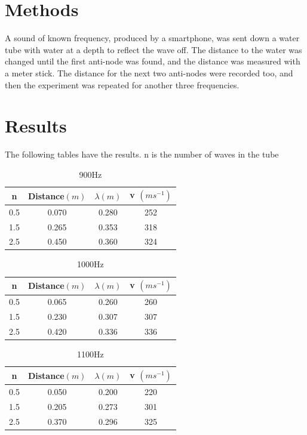 \documentclass{article}
\begin{document}
\section{Methods}
A sound of known frequency, produced by a smartphone, was sent down a water tube with water at a depth to reflect the wave off. The distance to the water was changed until the first anti-node was found, and the distance was measured with a meter stick. The distance for the next two anti-nodes were recorded too, and then the experiment was repeated for another three frequencies.


\section{Results}

The following tables have the results. n is the number of waves in the tube

\begin{table}[H]
    \centering
    \begin{tabular}{|c|c|c|c|}
    \hline
        n & Distance$(m)$ & $\lambda (m)$ & v $(ms^{-1})$ \\
        \hline\hline
        0.5 & 0.070 & 0.280 & 252\\\hline
        1.5 & 0.265 & 0.353 & 318\\\hline
        2.5 & 0.450 & 0.360 & 324\\\hline
    \end{tabular}
    \caption{900Hz}
    \label{tab:900Hz}
\end{table}


\begin{table}[H]
    \centering
    \begin{tabular}{|c|c|c|c|}
    \hline
        n & Distance$(m)$ & $\lambda (m)$ & v $(ms^{-1})$ \\
         \hline\hline
        0.5 & 0.065 & 0.260 & 260\\ \hline
        1.5 & 0.230 & 0.307 & 307\\ \hline
        2.5 & 0.420 & 0.336 & 336\\ \hline
    \end{tabular}
    \caption{1000Hz}
    \label{tab:1000Hz}
\end{table}


\begin{table}[H]
    \centering
    \begin{tabular}{|c|c|c|c|}
    \hline
        n & Distance$(m)$ & $\lambda (m)$ & v $(ms^{-1})$ \\
        \hline \hline
        0.5 & 0.050 & 0.200 & 220\\ \hline
        1.5 & 0.205 & 0.273 & 301\\ \hline
        2.5 & 0.370 & 0.296 & 325\\ \hline
    \end{tabular}
    \caption{1100Hz}
    \label{tab:1100Hz}
\end{table}
\end{document}
